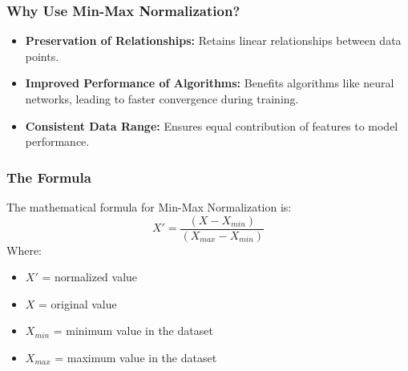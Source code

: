 \documentclass[aspectratio=169]{beamer}
\begin{document}
\begin{frame}[fragile]
    \frametitle{Why Use Min-Max Normalization?}
    \begin{itemize}
        \item \textbf{Preservation of Relationships:} Retains linear relationships between data points.
        \item \textbf{Improved Performance of Algorithms:} Benefits algorithms like neural networks, leading to faster convergence during training.
        \item \textbf{Consistent Data Range:} Ensures equal contribution of features to model performance.
    \end{itemize}
\end{frame}

\begin{frame}[fragile]
    \frametitle{The Formula}
    The mathematical formula for Min-Max Normalization is:
    \begin{equation}
        X' = \frac{(X - X_{min})}{(X_{max} - X_{min})}
    \end{equation}
    Where:
    \begin{itemize}
        \item \( X' \) = normalized value
        \item \( X \) = original value
        \item \( X_{min} \) = minimum value in the dataset
        \item \( X_{max} \) = maximum value in the dataset
    \end{itemize}
\end{frame}
\end{document}
